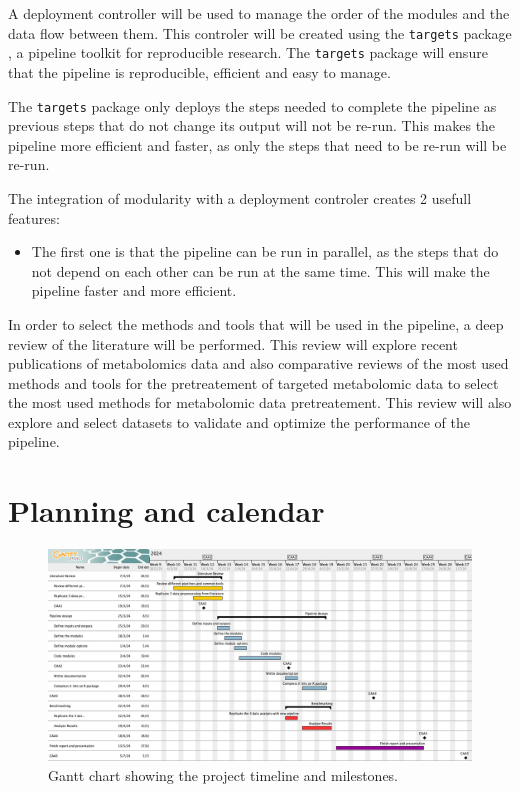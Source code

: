 \documentclass[ENG, BIB]{TFUOC}%
\begin{document}
A deployment controller will be used to manage the order of the modules and the data flow between them. This controler will be created using the \texttt{targets} package \cite{targets2021}, a pipeline toolkit for reproducible research. The \texttt{targets} package will ensure that the pipeline is reproducible, efficient and easy to manage.

The \texttt{targets} package only deploys the steps needed to complete the pipeline as previous steps that do not change its output will not be re-run. This makes the pipeline more efficient and faster, as only the steps that need to be re-run will be re-run. 

The integration of modularity with a deployment controler creates 2 usefull features:

\begin{itemize}
    \item The first one is that the pipeline can be run in parallel, as the steps that do not depend on each other can be run at the same time. This will make the pipeline faster and more efficient.
\end{itemize}


In order to select the methods and tools that will be used in the pipeline, a deep review of the literature will be performed. This review will explore recent publications of metabolomics data and also comparative reviews of the most used methods and tools for the pretreatement of targeted metabolomic data to select the most used methods for metabolomic data pretreatement. This review will also explore and select datasets to validate and optimize the performance of the pipeline.







\section{Planning and calendar}

\begin{figure}[htbp]
    \centering
    \includegraphics[width=\textwidth]{Images/gantt.png}
    \caption{Gantt chart showing the project timeline and milestones.}
    \label{fig:gantt}
\end{figure}
\end{document}
